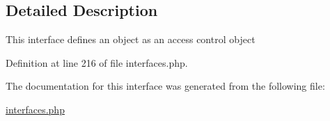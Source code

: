 \subsection{Detailed Description}
This interface defines an object as an access control object 

Definition at line 216 of file interfaces.php.



The documentation for this interface was generated from the following file:\begin{DoxyCompactItemize}
\item 
\hyperlink{interfaces_8php}{interfaces.php}\end{DoxyCompactItemize}
